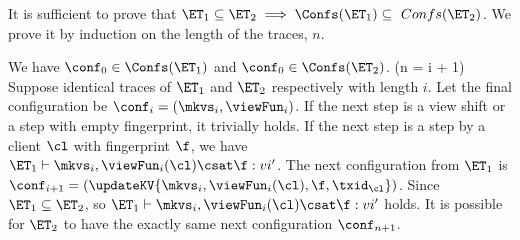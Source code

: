 It is sufficient to prove that \(\ET_1 \subseteq \ET_2 \implies \Confs(\ET_1) \subseteq\ Confs(\ET_2) \).
We prove it by induction on the length of the traces, \( n \).

We have \( \conf_0 \in \Confs(\ET_1) \) and \( \conf_0 \in \Confs(\ET_2)\).
\caseI(n = i + 1)
Suppose identical traces of \( \ET_1 \) and \( \ET_2 \) respectively with length \( i \).
Let the final configuration be \( \conf_i = ( \mkvs_i, \viewFun_i ) \).
If the next step is a view shift or a step with empty fingerprint, it trivially holds.
If the next step is a step by a client \( \cl \) with fingerprint \( \f \),
we have \( \ET_1 \vdash \mkvs_i, \viewFun_i(\cl) \csat \f : vi' \).
The next configuration from \( \ET_1 \) is \( \conf_{i+1} = (\updateKV{ \mkvs_i, \viewFun_i(\cl), \f, \txid_\cl}) \).
Since \( \ET_1 \subseteq \ET_2 \), so \( \ET_1 \vdash \mkvs_i, \viewFun_i(\cl) \csat \f : vi' \) holds.
It is possible for \( \ET_2 \) to have the exactly same next configuration \( \conf_{n+1}\).
